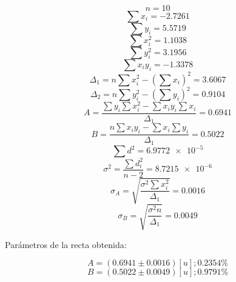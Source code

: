 \documentclass[letter,11pt]{article}
\begin{document}
\begin{equation*}
    n = 10
\end{equation*}
\begin{equation*}
    \sum x_i = -2.7261
\end{equation*}
\begin{equation*}
    \sum y_i = 5.5719
\end{equation*}
\begin{equation*}
    \sum x^2_i = 1.1038
\end{equation*}
\begin{equation*}
    \sum y^2_i = 3.1956
\end{equation*}
\begin{equation*}
    \sum x_i y_i = -1.3378
\end{equation*}
\begin{equation*}
    \Delta_1 = n \sum x^2_i - \left( \sum x_i \right)^2 = 3.6067
\end{equation*}
\begin{equation*}
    \Delta_2 = n \sum y^2_i - \left( \sum y_i \right)^2 = 0.9104
\end{equation*}
\begin{equation*}
    A = \frac{\sum y_i \sum x^2_i - \sum x_i y_i \sum x_i}{\Delta_1} = 0.6941
\end{equation*}
\begin{equation*}
    B = \frac{n \sum x_i y_i - \sum x_i \sum y_i}{\Delta_1} = 0.5022
\end{equation*}
\begin{equation*}
    \sum d^2 = \num{6.9772e-5}
\end{equation*}
\begin{equation*}
    \sigma^2 = \frac{\sum d^2_i}{n-2} = \num{8.7215e-6}
\end{equation*}
\begin{equation*}
    \sigma_A = \sqrt{\frac{\sigma^2 \sum x^2_i}{\Delta_1}} = 0.0016
\end{equation*}
\begin{equation*}
    \sigma_B = \sqrt{\frac{\sigma^2 n}{\Delta_1}} = 0.0049
\end{equation*}
\vspace{0.10cm}

Parámetros de la recta obtenida:

\begin{equation*}
    A = (0.6941 \pm 0.0016) [u]; 0.2354 \%
\end{equation*}
\begin{equation*}
    B = (0.5022 \pm 0.0049) [u]; 0.9791 \%
\end{equation*}
\vspace{0.10cm}
\end{document}
